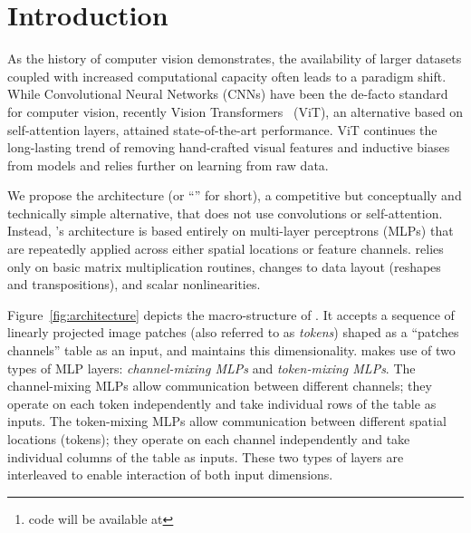 \begin{abstract}
Convolutional Neural Networks (CNNs) are the go-to model for computer vision.
Recently, attention-based networks, such as the Vision Transformer, have also become popular.
In this paper we show that while convolutions and attention are both sufficient for good performance, neither of them are necessary.
We present \emph{\fullname{}}, an architecture based exclusively on multi-layer perceptrons (MLPs).
\fullname{} contains two types of layers: one with MLPs applied independently to image patches (i.e.\,``mixing'' the per-location features), and one with MLPs applied across patches (i.e.\,``mixing'' spatial information).
When trained on large datasets, or with modern regularization schemes, \fullname{} attains competitive scores on image classification benchmarks, with  pre-training and inference cost comparable to state-of-the-art models.
We hope that these results spark further research beyond the realms of well established CNNs and Transformers.\footnote{\fullname{} code will be available at 
\codeurl{}
}
\end{abstract}

\section{Introduction}

As the history of computer vision demonstrates, the availability of larger datasets coupled with increased computational capacity often leads to a paradigm shift.
While Convolutional Neural Networks (CNNs) have been the de-facto standard for computer vision, recently Vision Transformers~\citep{Dosovitskiy2021} (ViT), an alternative based on self-attention layers, attained state-of-the-art performance.
ViT continues the long-lasting trend of removing hand-crafted visual features and inductive biases from models and relies further on learning from raw data.

We propose the \emph{\fullname{}} architecture (or ``\name{}'' for short), a competitive but conceptually and technically simple alternative, that does not use convolutions or self-attention.
Instead, \name{}'s architecture is based entirely on multi-layer perceptrons (MLPs) that are repeatedly applied across either spatial locations or feature channels.
\name{} relies only on basic matrix multiplication routines, changes to data layout (reshapes and transpositions), and scalar nonlinearities.
 
Figure~\ref{fig:architecture} depicts the macro-structure of \name{}. 
It accepts a sequence of linearly projected image patches (also referred to as \emph{tokens}) shaped as a ``patches\,\,channels'' table as an input, and maintains this dimensionality.
\name{} makes use of two types of MLP layers:  \emph{channel-mixing MLPs} and \emph{token-mixing MLPs}. 
The channel-mixing MLPs allow communication between different channels; they operate on each token independently and take individual rows of the table as inputs.
The token-mixing MLPs allow communication between different spatial locations (tokens); they operate on each channel independently and take individual columns of the table as inputs.
These two types of layers are interleaved to enable interaction of both input dimensions.

